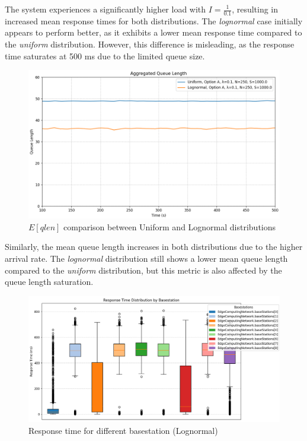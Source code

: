 \documentclass{report}
\begin{document}
The system experiences a significantly higher load with $I = \frac{1}{0.1}$, resulting in increased mean response times for both distributions. The \emph{lognormal} case initially appears to perform better, as it exhibits a lower mean response time compared to the \emph{uniform} distribution. However, this difference is misleading, as the response time saturates at 500 ms due to the limited queue size.

\begin{figure}[H]
    \centering
    \includegraphics[width=\textwidth]{img/plots/I-vary/Q_A_I01.png}
    \caption{$E[qlen]$ comparison between Uniform and Lognormal distributions}
\end{figure}

\begin{flushleft}
Similarly, the mean queue length increases in both distributions due to the higher arrival rate. The \emph{lognormal} distribution still shows a lower mean queue length compared to the \emph{uniform} distribution, but this metric is also affected by the queue length saturation.    
\end{flushleft}


\begin{figure}[H]
    \centering
    \includegraphics[width=\textwidth]{img/plots/I-vary/R_Box_Log_A_I01.png}
    \caption{Response time for different basestation (Lognormal)}
\end{figure}
\end{document}
